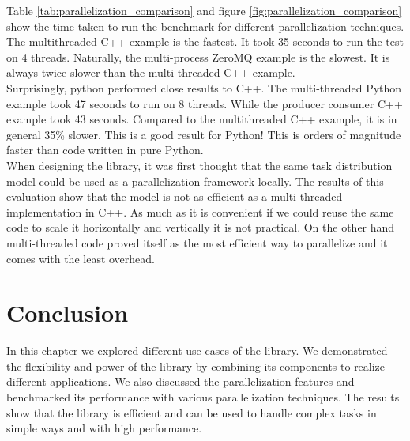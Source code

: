 \begin{spacing}{1.2}
    Table \ref{tab:parallelization_comparison} and figure \ref{fig:parallelization_comparison} show the time taken to run the
    benchmark for different parallelization techniques. The multithreaded C++ example is the fastest. It took 35 seconds to run 
    the test on 4 threads. Naturally, the multi-process ZeroMQ example is the slowest. It is always twice slower than the
    multi-threaded C++ example.\\

    Surprisingly, python performed close results to C++. The multi-threaded Python example took 47 seconds to run on 8 threads.
    While the producer consumer C++ example took 43 seconds. Compared to the multithreaded C++ example, it is in general 35\% 
    slower. This is a good result for Python! This is orders of magnitude faster than code written in pure Python.\\ 

    When designing the library, it was first thought that the same task distribution model could be used as a parallelization
    framework locally. The results of this evaluation show that the model is not as efficient as a multi-threaded implementation
    in C++. As much as it is convenient if we could reuse the same code to scale it horizontally and vertically it is not
    practical. On the other hand multi-threaded code proved itself as the most efficient way to parallelize and it comes 
    with the least overhead.\\
    \section*{Conclusion}
    In this chapter we explored different use cases of the library. We demonstrated the flexibility and power of the library
    by combining its components to realize different applications. We also discussed the parallelization features 
    and benchmarked its performance with various parallelization techniques. The results show that the library is
    efficient and can be used to handle complex tasks in simple ways and with high performance.\\

\end{spacing}
